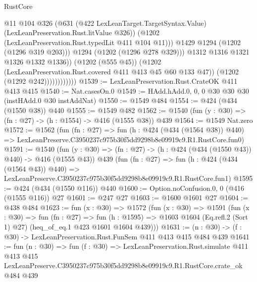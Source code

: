 \begin{lexlean}{RustCore}
\begin{coremodule}
                                  @11
                                  @104
                                  @326
                                  (@631
                                    (@422 LexLeanTarget.TargetSyntax.Value)
                                    (LexLeanPreservation.Rust.litValue @326))
                                  (@1202 (LexLeanPreservation.Rust.typedLit @411 @104 @11)))
                                @1429
                                @1294
                                (@1202 (@1296 @319 @203)))
                              @1294
                              (@1202 (@1296 @278 @329)))
                            @1312
                            @1316
                            @1321
                            @1326
                            @1332
                            @1336))
                        (@1202 (@555 @45))
                        (@1202 (LexLeanPreservation.Rust.covered @411 @413 @45 @60 @133 @47))
                        (@1202 (@1292 @242))))))))))))
@1539 := LexLeanPreservation.Rust.CrateOK @411 @413 @415
@1540 := Nat.casesOn.{0}
@1549 := HAdd.hAdd.{0, 0, 0} @30 @30 @30 (instHAdd.{0} @30 instAddNat)
@1550 := @1549 @484
@1554 := @424 (@434 (@1550 @38)) @440
@1555 := @1549 @482
@1562 := @1540 (fun (y : @30) => (fn : @27) -> (h : @1554) -> @416 (@1555 @38)) @439
@1564 := @1549 Nat.zero
@1572 := @1562
    (fun (fn : @27) =>
    fun (h : @424 (@434 (@1564 @38)) @440) =>
    LexLeanPreserve.C3950237c975b30f5dd9298b8e09919c9.R1.RustCore.fun0)
@1591 := @1540
    (fun (y : @30) => (fn : @27) -> (h : @424 (@434 (@1550 @43)) @440) -> @416 (@1555 @43))
    @439
    (fun (fn : @27) =>
    fun (h : @424 (@434 (@1564 @43)) @440) =>
    LexLeanPreserve.C3950237c975b30f5dd9298b8e09919c9.R1.RustCore.fun1)
@1595 := @424 (@434 (@1550 @116)) @440
@1600 := Option.noConfusion.{0, 0} (@416 (@1555 @116)) @27
@1601 := @247 @27
@1603 := @1600 @1601 @27
@1604 := @438 @484
@1623 := fun (x : @30) =>
  @1572
    (fun (x : @30) =>
    @1591
      (fun (x : @30) =>
      fun (fn : @27) =>
      fun (h : @1595) =>
      @1603 @1604 (Eq.refl.{2} (Sort 1) @27) (heq_of_eq.{1} @423 @1601 @1604 @439)))
@1631 := (n : @30) -> (f : @30) -> LexLeanPreservation.Rust.FunSem @411 @413 @415 @484 @439
@1641 := fun (n : @30) =>
  fun (f : @30) =>
  LexLeanPreservation.Rust.simulate
    @411
    @413
    @415
    LexLeanPreserve.C3950237c975b30f5dd9298b8e09919c9.R1.RustCore.crate_ok
    @484
    @439
\end{coremodule}
\end{lexlean}
